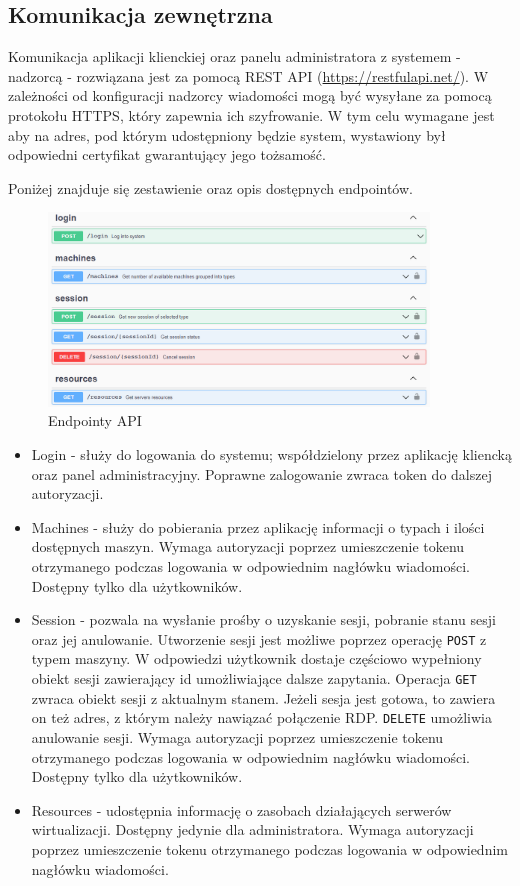 \documentclass[../opis-rozwiazania.tex]{subfiles}
\begin{document}
\subsection{Komunikacja zewnętrzna}
\label{communication:api}
Komunikacja aplikacji klienckiej oraz panelu administratora z systemem - nadzorcą - rozwiązana jest za pomocą REST API (\url{https://restfulapi.net/}). W zależności od konfiguracji nadzorcy wiadomości mogą być wysyłane za pomocą protokołu HTTPS, który zapewnia ich szyfrowanie. W tym celu wymagane jest aby na adres, pod którym udostępniony będzie system, wystawiony był odpowiedni certyfikat \parencite{ssl-cert} gwarantujący jego tożsamość.

Poniżej znajduje się zestawienie oraz opis dostępnych endpointów.

\begin{figure}[H]
  \centering
  \includegraphics[width=0.9\textwidth]{../api/endpoints.png}
  \caption{Endpointy API}
\end{figure}

\begin{itemize}
  \item Login - służy do logowania do systemu; współdzielony przez aplikację kliencką oraz panel administracyjny. Poprawne zalogowanie zwraca token do dalszej autoryzacji.
  \item Machines - służy do pobierania przez aplikację informacji o typach i ilości dostępnych maszyn. Wymaga autoryzacji poprzez umieszczenie tokenu otrzymanego podczas logowania w odpowiednim nagłówku wiadomości. Dostępny tylko dla użytkowników.
  \item Session - pozwala na wysłanie prośby o uzyskanie sesji, pobranie stanu sesji oraz jej anulowanie. Utworzenie sesji jest możliwe poprzez operację \texttt{POST} z typem maszyny. W odpowiedzi użytkownik dostaje częściowo wypełniony obiekt sesji zawierający id umożliwiające dalsze zapytania. Operacja \texttt{GET} zwraca obiekt sesji z aktualnym stanem. Jeżeli sesja jest gotowa, to zawiera on też adres, z którym należy nawiązać połączenie RDP. \texttt{DELETE} umożliwia anulowanie sesji. Wymaga autoryzacji poprzez umieszczenie tokenu otrzymanego podczas logowania w odpowiednim nagłówku wiadomości. Dostępny tylko dla użytkowników.
  \item Resources - udostępnia informację o zasobach działających serwerów wirtualizacji. Dostępny jedynie dla administratora. Wymaga autoryzacji poprzez umieszczenie tokenu otrzymanego podczas logowania w odpowiednim nagłówku wiadomości.
\end{itemize}
\end{document}
